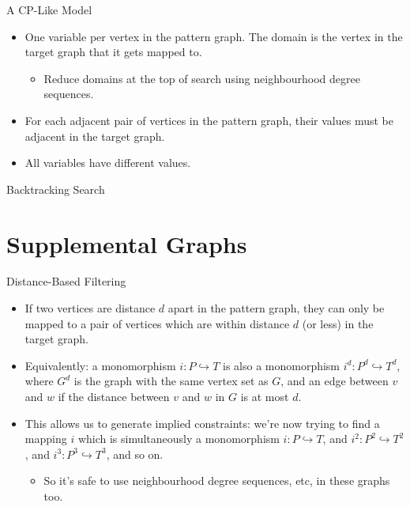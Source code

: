 \documentclass{beamer}
\begin{document}
\begin{frame}{A CP-Like Model}

    \begin{itemize}
        \item One variable per vertex in the pattern graph. The domain is the vertex in the target
            graph that it gets mapped to.

            \begin{itemize}
                \item Reduce domains at the top of search using neighbourhood degree sequences.
            \end{itemize}

        \item For each adjacent pair of vertices in the pattern graph, their values must be adjacent
            in the target graph.

        \item All variables have different values.
    \end{itemize}

\end{frame}

\begin{frame}{Backtracking Search}

\end{frame}

\section{Supplemental Graphs}

\begin{frame}{Distance-Based Filtering}

    \begin{itemize}
        \item If two vertices are distance $d$ apart in the pattern graph, they can only be mapped
            to a pair of vertices which are within distance $d$ (or less) in the target graph.

        \item Equivalently: a monomorphism $i : P \hookrightarrow T$ is also a monomorphism $i^d
            : P^d \hookrightarrow T^d$, where $G^d$ is the graph with the same vertex set as
            $G$, and an edge between $v$ and $w$ if the distance between $v$ and $w$ in $G$ is
            at most $d$.

        \item This allows us to generate implied constraints: we're now trying to find a
            mapping $i$ which is simultaneously a monomorphism $i : P \hookrightarrow T$, and
            $i^2 : P^2 \hookrightarrow T^2$, and $i^3 : P^3 \hookrightarrow T^3$, and so on.

            \begin{itemize}
                \item So it's safe to use neighbourhood degree sequences, etc, in these graphs too.
            \end{itemize}
    \end{itemize}
\end{frame}
\end{document}
